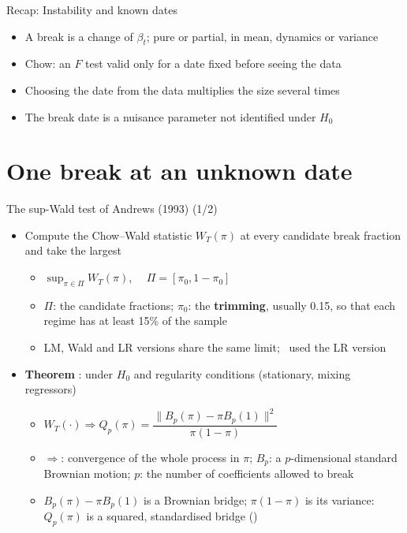 \begin{frame}{Recap: Instability and known dates}
\itemsize{\small}
\begin{itemize}
    \item A break is a change of $\beta_t$; pure or partial, in mean, dynamics or variance
    \item Chow: an $F$ test valid only for a date fixed before seeing the data
    \item Choosing the date from the data multiplies the size several times
    \item The break date is a nuisance parameter not identified under $H_0$
\end{itemize}
\end{frame}


\section{One break at an unknown date}

\begin{frame}{The sup-Wald test of Andrews (1993) (1/2)}
\itemsize{\small}
\begin{itemize}
    \item Compute the Chow--Wald statistic $W_T(\pi)$ at every candidate break fraction and take the largest 
    \begin{itemize}
        \item $\sup_{\pi \in \Pi} W_T(\pi)$, $\quad \Pi = [\pi_0, 1 - \pi_0]$
        \item $\Pi$: the candidate fractions; $\pi_0$: the \textbf{trimming}, usually 0.15, so that each regime has at least 15\% of the sample
        \item LM, Wald and LR versions share the same limit; \ used the LR version
    \end{itemize}
    \item \textbf{Theorem} : under $H_0$ and regularity conditions (stationary, mixing regressors)
    \begin{itemize}
        \item $W_T(\cdot) \Rightarrow Q_p(\pi) = \dfrac{\|B_p(\pi) - \pi B_p(1)\|^2}{\pi(1 - \pi)}$
        \item $\Rightarrow$: convergence of the whole process in $\pi$; $B_p$: a $p$-dimensional standard Brownian motion; $p$: the number of coefficients allowed to break
        \item $B_p(\pi) - \pi B_p(1)$ is a Brownian bridge; $\pi(1 - \pi)$ is its variance: $Q_p(\pi)$ is a squared, standardised bridge ()
    \end{itemize}
\end{itemize}
\end{frame}


